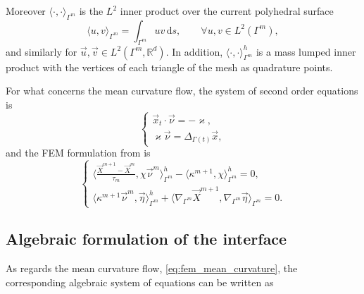 Moreover $\langle\cdot,\cdot\rangle_{\Gamma^m}$ is the $L^2$ inner product over
the current polyhedral surface
\begin{equation}\label{}
 \langle u,v\rangle_{\Gamma^m} = \int_{\Gamma^m}uv\,\mathrm{d}s,\qquad\forall
  u,v\in L^2(\Gamma^m),
\end{equation}
and similarly for $\vec{u},\vec{v}\in L^2(\Gamma^m,\mathbb{R}^d)$. In addition,
$\langle \cdot,\cdot\rangle_{\Gamma^m}^h$ is a mass lumped inner product with
the vertices of each triangle of the mesh as quadrature points.
\newline

For what concerns the mean curvature flow, the system of second order equations
is
\begin{equation}\label{eq:mean_curvature_sys}
 \begin{cases}
  \vec{x}_t\cdot\vec{\nu}=-\varkappa,\\
  \varkappa\vec{\nu}=\Delta_{\Gamma(t)}\vec{x},
 \end{cases}
\end{equation}
and the FEM formulation from \cite{gflows3d} is
\begin{equation}\label{eq:fem_mean_curvature}
 \begin{cases}
  \langle \frac{\vec{X}^{m + 1} - \vec{X}^{m}}{\tau_m},
  \chi\vec{\nu}^m\rangle_{\Gamma^m}^{h} - \langle\kappa^{m+1}, \chi
  \rangle_{\Gamma^m}^{h}=0,\\
  \langle\kappa^{m+1}\vec{\nu}^m, \vec{\eta}\rangle_{\Gamma^m}^{h} +
  \langle\nabla_{\Gamma^m}\vec{X}^{m + 1}, \nabla_{\Gamma^m}\vec{\eta}
  \rangle_{\Gamma^m}=0.
 \end{cases}
\end{equation}

\subsection{Algebraic formulation of the interface}

As regards the mean curvature flow, \eqref{eq:fem_mean_curvature}, the
corresponding algebraic system of equations can be written as

